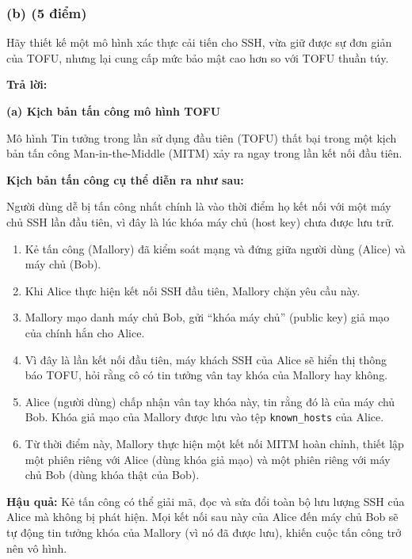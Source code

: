 \subsubsection{(b) (5 điểm)}

Hãy thiết kế một mô hình xác thực cải tiến cho SSH,
vừa giữ được sự đơn giản của TOFU,
nhưng lại cung cấp mức bảo mật cao hơn so với TOFU thuần túy.

\begin{center}
    \textbf{Trả lời:}
\end{center}

\textbf{(a) Kịch bản tấn công mô hình TOFU}

Mô hình Tin tưởng trong lần sử dụng đầu tiên (TOFU) thất bại trong một kịch bản tấn công Man-in-the-Middle (MITM) xảy ra ngay trong lần kết nối đầu tiên.

\textbf{Kịch bản tấn công cụ thể diễn ra như sau:}

Người dùng dễ bị tấn công nhất chính là vào thời điểm họ kết nối với một máy chủ SSH lần đầu tiên, vì đây là lúc khóa máy chủ (host key) chưa được lưu trữ.

\begin{enumerate}
    \item Kẻ tấn công (Mallory) đã kiểm soát mạng và đứng giữa người dùng (Alice) và máy chủ (Bob).
    
    \item Khi Alice thực hiện kết nối SSH đầu tiên, Mallory chặn yêu cầu này.
    
    \item Mallory mạo danh máy chủ Bob, gửi ``khóa máy chủ'' (public key) giả mạo của chính hắn cho Alice.
    
    \item Vì đây là lần kết nối đầu tiên, máy khách SSH của Alice sẽ hiển thị thông báo TOFU, hỏi rằng cô có tin tưởng vân tay khóa của Mallory hay không.
    
    \item Alice (người dùng) chấp nhận vân tay khóa này, tin rằng đó là của máy chủ Bob. Khóa giả mạo của Mallory được lưu vào tệp \texttt{known\_hosts} của Alice.
    
    \item Từ thời điểm này, Mallory thực hiện một kết nối MITM hoàn chỉnh, thiết lập một phiên riêng với Alice (dùng khóa giả mạo) và một phiên riêng với máy chủ Bob (dùng khóa thật của Bob).
\end{enumerate}

\textbf{Hậu quả:} Kẻ tấn công có thể giải mã, đọc và sửa đổi toàn bộ lưu lượng SSH của Alice mà không bị phát hiện. Mọi kết nối sau này của Alice đến máy chủ Bob sẽ tự động tin tưởng khóa của Mallory (vì nó đã được lưu), khiến cuộc tấn công trở nên vô hình.

